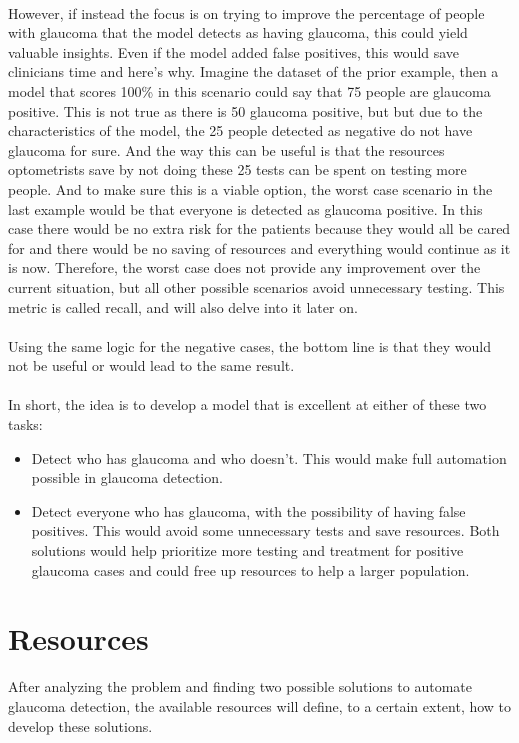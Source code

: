 \documentclass[11pt, a4paper]{article}
\begin{document}
\\
However, if instead the focus is on trying to improve the percentage of people with glaucoma that the model detects as having glaucoma, this could yield valuable insights. Even if the model added false positives, this would save clinicians time and here's why. Imagine the dataset of the prior example, then a model that scores 100\% in this scenario could say that 75 people are glaucoma positive. This is not true as there is 50 glaucoma positive, but but due to the characteristics of the model, the 25 people detected as negative do not have glaucoma for sure. And the way this can be useful is that the resources optometrists save by not doing these 25 tests can be spent on testing more people. And to make sure this is a viable option, the worst case scenario in the last example would be that everyone is detected as glaucoma positive. In this case there would be no extra risk for the patients because they would all be cared for and there would be no saving of resources and everything would continue as it is now. Therefore, the worst case does not provide any improvement over the current situation, but all other possible scenarios avoid unnecessary testing. This metric is called recall, and will also delve into it later on.
\\
\\
Using the same logic for the negative cases, the bottom line is that they would not be useful or would lead to the same result.
\\
\\
In short, the idea is to develop a model that is excellent at either of these two tasks:
\begin{itemize}
    \item Detect who has glaucoma and who doesn't. This would make full automation possible in glaucoma detection.
    \item Detect everyone who has glaucoma, with the possibility of having false positives. This would avoid some unnecessary tests and save resources.
Both solutions would help prioritize more testing and treatment for positive glaucoma cases and could free up resources to help a larger population.
\end{itemize}
\section{Resources}
After analyzing the problem and finding two possible solutions to automate glaucoma detection, the available resources will define, to a certain extent, how to develop these solutions.
\end{document}
